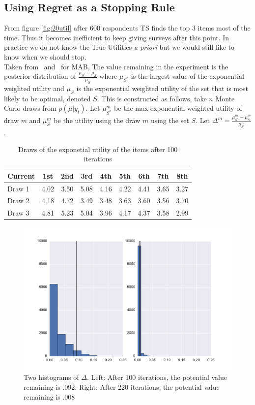 \documentclass[nonblindrev]{informs3}
\begin{document}
\subsection{Using Regret as a Stopping Rule}
From figure \ref{fig:20util} after 600 respondents TS finds the top 3 items most of the time. Thus it becomes inefficient to keep giving surveys after this point. In practice we do not know the True Utilities \textit{a priori} but we would still like to know when we should stop.\\
Taken from~\cite{scott2015multi} and~\cite{scott2010modern} for MAB, The value remaining in the experiment is the posterior distribution of $\frac{\mu_{S^*}-\mu_{S}}{\mu_{S}}$ where $\mu_{S^*}$ is the largest value of the exponential weighted utility and $\mu_{S}$ is the exponential weighted utility of the set that is most likely to be optimal, denoted $S$. This is constructed as follows, take $n$ Monte Carlo draws from $p(\mu|y_t)$. Let $\mu_{S^*}^{m}$ be the max exponential weighted utility of draw $m$ and $\mu_{S}^{m}$ be the utility using the draw $m$ using the set $S$. Let $\Delta^{m}=\frac{\mu^m_{S^*}-\mu^m_{S}}{\mu^m_{S}}$.\\
\begin{table}
\begin{center}
\begin{tabular}{l | c c c c c c c c}
Current & 1st &  2nd  &  3rd  &  4th &  5th & 6th & 7th &  8th \\
\hline
Draw 1 & 4.02 &  3.50 &  5.08 & 4.16&  4.22 & 4.41 & 3.65 &  3.27 \\
Draw 2 &4.18 & 4.72 & 3.49 & 3.48 & 3.63 & 3.60 & 3.56 &  3.70 \\
Draw 3 &4.81 & 5.23 & 5.04 &  3.96 &  4.17 & 4.37 &  3.58 & 2.99 \\ 
\end{tabular}
\end{center}
\caption{Draws of the exponetial utility of the items after 100 iterations}
\label{table:data}
\end{table}
\begin{figure}
\includegraphics[width=1\linewidth]{plots/valremhist.pdf}
\caption{Two histograms of $\Delta$. Left: After 100 iterations, the potential value remaining is .092. Right: After 220 iterations, the potential value remaining is .008}
\label{fig:data}
\end{figure}
\end{document}
